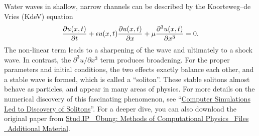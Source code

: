 \documentclass{../project}
\begin{document}
\begin{sheet}[title={Project 4: Partial differential equations (PDEs)}, number=4, due={December 20th, 10am}]
\begin{problem}[title={Solitons}, label=solitons]
  Water waves
  in shallow, narrow channels
  can be described by the Koorteweg--de Vries (KdeV) equation
  \begin{equation}
    \pdv{u(x,t)}{t}
    + \epsilon u(x,t) \pdv{u(x,t)}{x}
    + \mu \frac{\partial^3 u(x,t)}{\partial x^3} = 0.
  \end{equation}
  The non-linear term leads to a sharpening of the wave
  and ultimately to a shock wave.
  In contrast, the $\partial^3 u / \partial x^3$ term
  produces broadening.
  For the proper parameters and initial conditions,
  the two effects exactly balance each other,
  and a stable wave is formed,
  which is called a ``soliton''.
  These stable solitons almost behave as particles,
  and appear in many areas of physics.
  For more details on the numerical discovery of this fascinating phenomenon, see
  ``\href{https://physics.aps.org/articles/v6/15}{Computer Simulations Led to Discovery of Solitons}''.
  For a deeper dive, you can also download the original paper from
  \href{https://www.studip.uni-goettingen.de/dispatch.php/course/files/index/456b3abe95c2a22ac980707f6d7e1368?cid=1a9a322e21be361e60889361d2ce1a0f}{Stud.IP \goto\ Übung: Methods of Computational Physics \goto\ Files \goto\ Additional Material}.


\end{problem}
\end{sheet}
\end{document}
